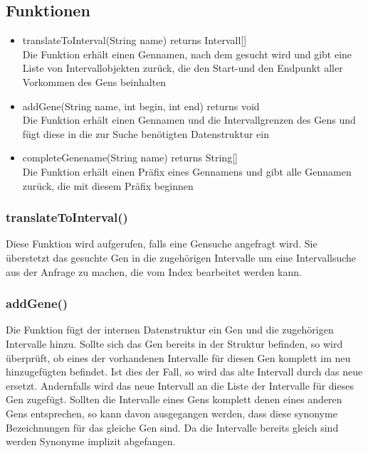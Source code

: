 \documentclass[]{article}
\begin{document}
\subsection{Funktionen}
\begin{itemize}
\item translateToInterval(String name) returns Intervall[]\\
Die Funktion erhält einen Gennamen, nach dem gesucht wird und gibt eine Liste von Intervallobjekten zurück, die den Start-und den Endpunkt aller Vorkommen des Gens beinhalten
\item addGene(String name, int begin, int end) returns void\\
Die Funktion erhält einen Gennamen und die Intervallgrenzen des Gens und fügt diese in die zur Suche benötigten Datenstruktur ein
\item completeGenename(String name) returns String[]\\
Die Funktion erhält einen Präfix eines Gennamens und gibt alle Gennamen zurück, die mit diesem Präfix beginnen
\end{itemize}
\subsubsection{translateToInterval()}
Diese Funktion wird aufgerufen, falls eine Gensuche angefragt wird. Sie überstetzt das gesuchte Gen in die zugehörigen Intervalle um eine Intervallsuche aus der Anfrage zu machen, die vom Index bearbeitet werden kann.

\subsubsection{addGene()}
Die Funktion fügt der internen Datenstruktur ein Gen und die zugehörigen Intervalle hinzu. Sollte sich das Gen bereits in der Struktur befinden, so wird überprüft, ob eines der vorhandenen Intervalle für diesen Gen komplett im neu hinzugefügten befindet. Ist dies der Fall, so wird das alte Intervall durch das neue ersetzt. Andernfalls wird das neue Intervall an die Liste der Intervalle für dieses Gen zugefügt. Sollten die Intervalle eines Gens komplett denen eines anderen Gens entsprechen, so kann davon ausgegangen werden, dass diese synonyme Bezeichnungen für das gleiche Gen sind. Da die Intervalle bereits gleich sind werden Synonyme implizit abgefangen.
\end{document}
